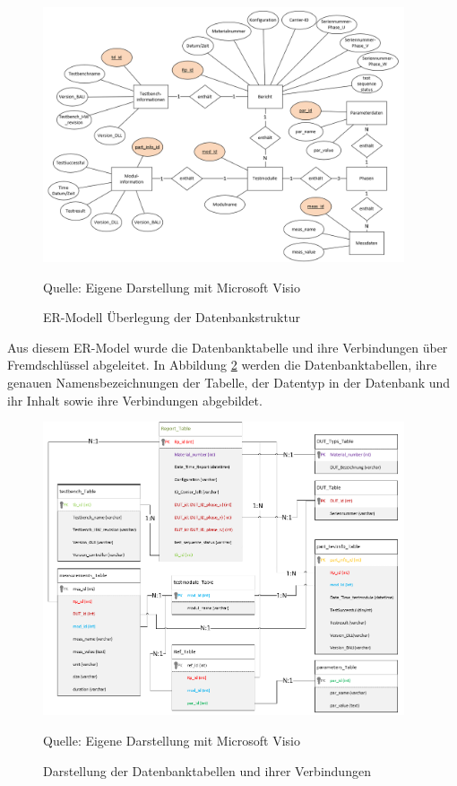 \begin{figure}[H]
    \centering
    \includegraphics[width=0.95\textwidth]{Grafiken/Bild von ER-Modell}
    \caption{ER-Modell Überlegung der Datenbankstruktur}
    \label{fig: ER-Modell Überlegung der Datenbankstruktur}
    {Quelle: Eigene Darstellung mit Microsoft Visio}
\end{figure}

Aus diesem ER-Model wurde die Datenbanktabelle und ihre Verbindungen über Fremdschlüssel abgeleitet. In Abbildung \ref{fig: Darstellung der Datenbanktabellen und ihrer Verbindungen}
werden die Datenbanktabellen, ihre genauen Namensbezeichnungen der Tabelle, der Datentyp in der Datenbank und ihr Inhalt sowie ihre Verbindungen abgebildet.

\begin{figure}[H]
    \centering
    \includegraphics[width=0.95\textwidth]{Grafiken/Tabellendiagramm Datenbank}
    \caption{Darstellung der Datenbanktabellen und ihrer Verbindungen}
    \label{fig: Darstellung der Datenbanktabellen und ihrer Verbindungen}
    {Quelle: Eigene Darstellung mit Microsoft Visio}
\end{figure}


